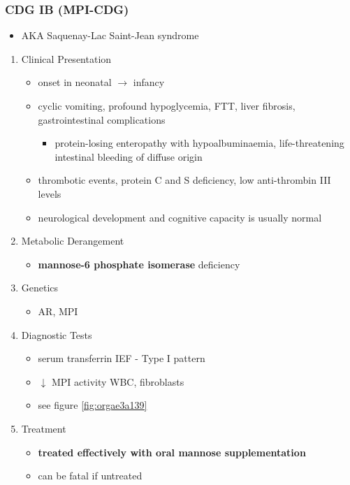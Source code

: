 \documentclass[12pt]{scrartcl}
\begin{document}
\subsubsection{CDG IB (MPI-CDG)}
\label{sec:org8d0e67d}
\begin{itemize}
\item AKA Saquenay-Lac Saint-Jean syndrome
\end{itemize}
\begin{enumerate}
\item Clinical Presentation
\label{sec:org63e2201}
\begin{itemize}
\item onset in neonatal \(\to\) infancy
\item cyclic vomiting, profound hypoglycemia, FTT, liver
fibrosis, gastrointestinal complications
\begin{itemize}
\item protein-losing enteropathy with hypoalbuminaemia, life-threatening
intestinal bleeding of diffuse origin
\end{itemize}
\item thrombotic events, protein C and S deficiency, low anti-thrombin III levels
\item neurological development and cognitive capacity is usually normal
\end{itemize}

\item Metabolic Derangement
\label{sec:org1924250}
\begin{itemize}
\item \textbf{mannose-6 phosphate isomerase} deficiency
\end{itemize}


\item Genetics
\label{sec:orgf03eab9}
\begin{itemize}
\item AR, MPI
\end{itemize}

\item Diagnostic Tests
\label{sec:org565959f}
\begin{itemize}
\item serum transferrin IEF - Type I pattern
\item \(\downarrow\) MPI activity WBC, fibroblasts
\item see figure \ref{fig:orgae3a139}
\end{itemize}
\item Treatment
\label{sec:orgf58f6c9}
\begin{itemize}
\item \textbf{treated effectively with oral mannose supplementation}
\item can be fatal if untreated
\end{itemize}
\end{enumerate}
\end{document}
